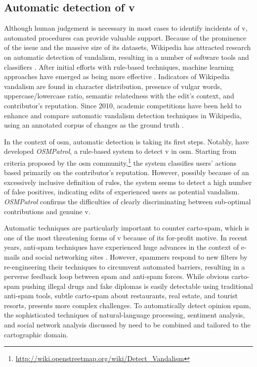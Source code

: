 \documentclass{article} \usepackage{graphicx,xspace}
\newcommand{\footurl}[1]{\footnote{\url{#1}}}
\begin{document}
\subsection{Automatic detection of \protect\gls{v}}

Although human judgement is necessary in most cases to identify incidents of \gls{v}, automated procedures can provide valuable support. 
Because of the prominence of the issue and the massive size of its datasets, Wikipedia has attracted research on automatic detection of vandalism, resulting in a number of software tools and classifiers \citep{adler:2011:wikipediavandaldetect}.
After initial efforts with rule-based techniques, machine learning approaches have emerged as being more effective \cite[e.g.][]{potthast:2008:automatic}.
Indicators of Wikipedia vandalism are found in character distribution, presence of vulgar words, uppercase/lowercase ratio, semantic relatedness with the edit's context, and contributor's reputation.
Since 2010, academic competitions have been held to enhance and compare automatic vandalism detection techniques in Wikipedia, using an annotated corpus of changes as the ground truth \citep{potthast:2011:wikipediavandalsdetection}.

In the context of \gls{osm}, automatic detection is taking its first steps.
Notably, \cite{neis:2012:autovandalism} have developed \emph{OSMPatrol}, a rule-based system to detect \gls{v} in \gls{osm}.
Starting from criteria proposed by the \gls{osm} community,\footurl{http://wiki.openstreetmap.org/wiki/Detect_Vandalism} the system classifies users' actions based primarily on the contributor's reputation.
However, possibly because of an excessively inclusive definition of rules, the system seems to detect a high number of false positives, indicating edits of experienced users as potential vandalism.
\emph{OSMPatrol} confirms the difficulties of clearly discriminating between sub-optimal contributions and genuine \gls{v}.

Automatic techniques are particularly important to counter carto-spam, which is one of the most threatening forms of \gls{v} because of its for-profit motive.
In recent years, anti-spam techniques have experienced huge advances in the context of e-mails and social networking sites \citep{heymann:2007:fighting}.
However, spammers respond to new filters by re-engineering their techniques to circumvent automated barriers, resulting in a perverse feedback loop between spam and anti-spam forces.
While obvious carto-spam pushing illegal drugs and fake diplomas is easily detectable using traditional anti-spam tools, subtle carto-spam about restaurants, real estate, and tourist resorts, presents more complex challenges.
To automatically detect opinion spam, the sophisticated techniques of natural-language processing, sentiment analysis, and social network analysis discussed by \cite{jindal:2008:opinionspam} need to be combined and tailored to the cartographic domain.
\end{document}

